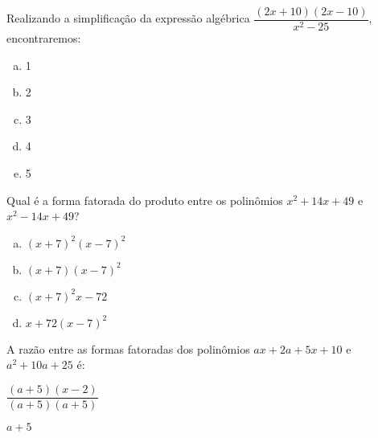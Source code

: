 \begin{secExercicios}
\begin{exer}
  Realizando a simplificação da expressão algébrica $\dfrac{(2x+10)(2x-10)}{x^2 - 25},$ encontraremos:
  \begin{multicols}{5}
  \begin{enumerate}[a)]
        \item 1
        
         \item 2
        
        \item 3
        
       \item 4
        
        \item 5
    \end{enumerate}
  \end{multicols}
  
\end{exer}

\begin{exer}
  Qual é a forma fatorada do produto entre os polinômios $x^2 + 14x + 49$ e $x^2 - 14x + 49$?
  \begin{multicols}{2}
  \begin{enumerate}[a)]
        \item $(x + 7)^2(x - 7)^2$
        
       \item $(x + 7)(x - 7)^2$
        
       \item $(x + 7)^2x - 72$
        
        \item $x + 72(x - 7)^2$
        
  \end{enumerate}
  \end{multicols}
  
\end{exer}

\begin{exer}
   A razão entre as formas fatoradas dos polinômios $ax + 2a + 5x + 10$ e $a^2 + 10a + 25$ é:
  \begin{enumerate}[a)]\begin{multicols}{2}
        \item $\dfrac{(a+5)(x-2)}{(a + 5)(a+5)}$
        
         \item $a+5$
        

\end{multicols}
\end{enumerate}
\end{exer}
\end{secExercicios}
